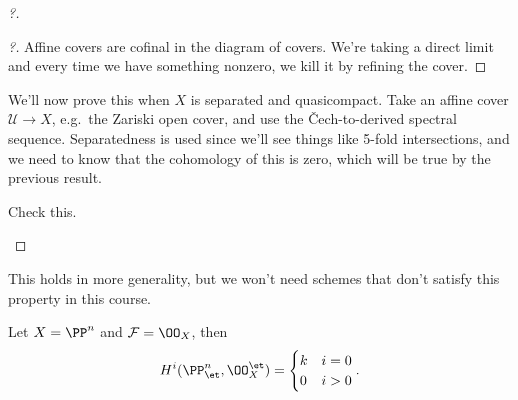 \begin{proof}[?]
\begin{claim}[3]
\end{claim}

\begin{proof}[?]

Affine covers are cofinal in the diagram of covers. We're taking a
direct limit and every time we have something nonzero, we kill it by
refining the cover.

\end{proof}

We'll now prove this when \(X\) is separated and quasicompact. Take an
affine cover \(\mathcal{U}\to X\), e.g.~the Zariski open cover, and use
the Čech-to-derived spectral sequence. Separatedness is used since we'll
see things like 5-fold intersections, and we need to know that the
cohomology of this is zero, which will be true by the previous result.

\begin{exercise}[?]

Check this.

\end{exercise}

\end{proof}

\begin{remark}

This holds in more generality, but we won't need schemes that don't
satisfy this property in this course.

\end{remark}

\begin{example}[?]

Let \(X = \PP^n\) and \(\mathcal{F} = \OO_X\), then
\begin{align*}  
H^i(\PP^n_\et, \OO_X^{\et}) = 
\begin{cases}
k & i= 0 \\
0 & i>0
\end{cases}
.\end{align*}

\end{example}

